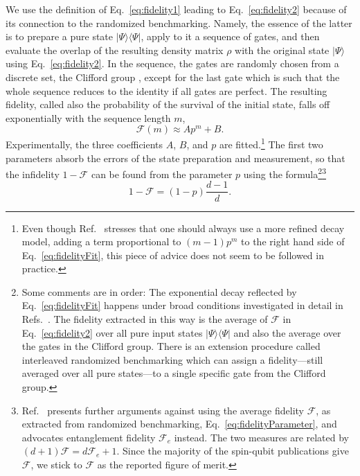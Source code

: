 \documentclass[aps, prx, showpacs, twocolumn, superscriptaddress, notitlepage, longbibliography, floatfix, nofootinbib]{revtex4-2}
\begin{document}
We use the definition of Eq.~\eqref{eq:fidelity1} leading to Eq.~\eqref{eq:fidelity2} because of its connection to the randomized benchmarking. Namely, the essence of the latter is to prepare a pure state $|\Psi\rangle \langle \Psi|$, apply to it a sequence of gates, and then evaluate the overlap of the resulting density matrix $\rho$ with the original state $|\Psi\rangle$ using Eq.~\ref{eq:fidelity2}. In the sequence, the gates are randomly chosen from a discrete set, the Clifford group \cite{gottesman_theory_1998}, except for the last gate which is such that the whole sequence reduces to the identity if all gates are perfect. The resulting fidelity, called also the probability of the survival of the initial state, falls off exponentially with the sequence length $m$,
\begin{equation}
\mathcal{F}(m) \approx A p^m + B.
\label{eq:fidelityFit}
\end{equation}
Experimentally, the three coefficients $A$, $B$, and $p$ are fitted.\footnote{Even though Ref.~\cite{magesan_characterizing_2012} stresses that one should always use a more refined decay model, adding a term proportional to $(m-1)p^m$ to the right hand side of Eq.~\eqref{eq:fidelityFit}, this piece of advice does not seem to be followed in practice.} The first two parameters absorb the errors of the state preparation and measurement, so that the infidelity $1-\mathcal{F}$ can be found from the parameter $p$ using the formula\footnote{Some comments are in order: The exponential decay reflected by Eq.~\eqref{eq:fidelityFit} happens under broad conditions investigated in detail in Refs.~\cite{magesan_characterizing_2012,epstein_investigating_2014}. The fidelity extracted in this way is the average of $\mathcal{F}$ in Eq.~\eqref{eq:fidelity2} over all pure input states $|\Psi\rangle\langle \Psi|$ and also the average over the gates in the Clifford group. There is an extension procedure called interleaved randomized benchmarking \cite{magesan_efficient_2012} which can assign a fidelity---still averaged over all pure states---to a single specific gate from the Clifford group.}\footnote{Ref.~\cite{gilchrist_distance_2005} presents further arguments against using the average fidelity $\mathcal{F}$, as extracted from randomized benchmarking, Eq.~\eqref{eq:fidelityParameter}, and advocates entanglement fidelity $\mathcal{F}_e$ instead. The two measures are related by $(d+1)\mathcal{F}=d\mathcal{F}_e+1$. Since the majority of the spin-qubit publications give $\mathcal{F}$, we stick to $\mathcal{F}$ as the reported figure of merit.}
\begin{equation}
1-\mathcal{F} = (1-p) \frac{d-1}{d}.
\label{eq:fidelityParameter}
\end{equation}
\end{document}
